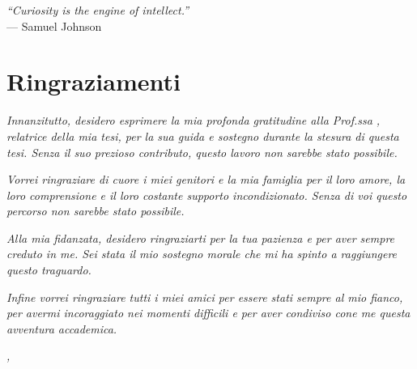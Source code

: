 \cleardoublepage{}

\begin{flushright}{
    \slshape
    ``Curiosity is the engine of intellect.''} \\
    \medskip
    --- Samuel Johnson
\end{flushright}


\bigskip

\begingroup
\let\clearpage\relax
\let\cleardoublepage\relax
\let\cleardoublepage\relax

\chapter*{Ringraziamenti}

\noindent \textit{Innanzitutto, desidero esprimere la mia profonda gratitudine alla Prof.ssa \myProf, relatrice della mia tesi, per la sua guida e sostegno durante la stesura di questa tesi. Senza il suo prezioso contributo, questo lavoro non sarebbe stato possibile.\\}

\noindent \textit{Vorrei ringraziare di cuore i miei genitori e la mia famiglia per il loro amore, la loro comprensione e il loro costante supporto incondizionato. Senza di voi questo percorso non sarebbe stato possibile.\\}

\noindent \textit{Alla mia fidanzata, desidero ringraziarti per la tua pazienza e per aver sempre creduto in me. Sei stata il mio sostegno morale che mi ha spinto a raggiungere questo traguardo. \\}

\noindent \textit{Infine vorrei ringraziare tutti i miei amici per essere stati sempre al mio fianco, per avermi incoraggiato nei momenti difficili e per aver condiviso cone me questa avventura accademica.\\}



\bigskip

\noindent\textit{\myLocation, \myTime}
\hfill \myName\endgroup
